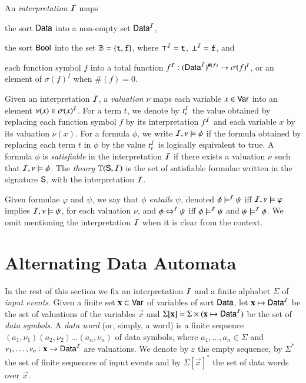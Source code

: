 \documentclass{llncs}
\begin{document}
An \emph{interpretation} $\mathcal{I}$ maps\begin{inparaenum}[(1)]
\item the sort $\mathsf{Data}$ into a non-empty set $\mathsf{Data}^{\mathcal{I}}$, 
%
\item the sort $\mathsf{Bool}$ into the set $\mathbb{B} = \left\{ \mathtt{t},\mathtt{f} \right\}$, where
  $\top^{\mathcal{I}} = \mathtt{t}$, $\bot^{\mathcal{I}} = \mathtt{f}$, and
%
\item each function symbol $f$ into a total function $f^{\mathcal{I}} :
  (\mathsf{Data}^{\mathcal{I}})^{\#(f)} \rightarrow \sigma(f)^I$, or an element of
  $\sigma(f)^I$ when $\#(f)=0$.
\end{inparaenum}
Given an interpretation $\mathcal{I}$, a \emph{valuation} $\nu$ maps each
variable $x \in \mathsf{Var}$ into an element $\nu(x) \in \sigma(x)^{\mathcal{I}}$. For
a term $t$, we denote by $t^{\mathcal{I}}_\nu$ the value obtained by replacing
each function symbol $f$ by its interpretation $f^{\mathcal{I}}$ and each
variable $x$ by its valuation $\nu(x)$. For a formula $\phi$, we write
$\mathcal{I},\nu \models \phi$ if the formula obtained by replacing each term
$t$ in $\phi$ by the value $t^{\mathcal{I}}_\nu$ is logically equivalent to true.
A formula $\phi$ is \emph{satisfiable} in the interpretation $\mathcal{I}$ if
there exists a valuation $\nu$ such that $\mathcal{I},\nu \models \phi$. The
\emph{theory} $\mathbb{T}(\mathsf{S},\mathcal{I})$ is the set of satisfiable formulae
written in the signature $\mathsf{S}$, with the interpretation $\mathcal{I}$. 

Given formulae $\varphi$ and $\psi$, we say that \emph{$\phi$ entails
  $\psi$}, denoted $\phi \models^{\mathcal{I}} \psi$ iff $\mathcal{I},\nu \models \varphi$
implies $\mathcal{I},\nu \models \psi$, for each valuation $\nu$, and $\phi
\Leftrightarrow^{\mathcal{I}} \psi$ iff $\phi \models^{\mathcal{I}} \psi$ and $\psi \models^{\mathcal{I}} \phi$.
We omit mentioning the interpretation $\mathcal{I}$ when it is clear from the
context.

\section{Alternating Data Automata}

In the rest of this section we fix an interpretation $\mathcal{I}$ and a finite
alphabet $\Sigma$ of \emph{input events}. Given a finite set $\mathbf x
\subset \mathsf{Var}$ of variables of sort $\mathsf{Data}$, let $\mathbf x \mapsto
\mathsf{Data}^{\mathcal{I}}$ be the set of valuations of the variables $\vec{x}$ and
$\Sigma[\mathbf x] = \Sigma \times (\mathbf x \mapsto \mathsf{Data}^{\mathcal{I}})$ be the
set of \emph{data symbols}. A \emph{data word} (or, simply, a word) is
a finite sequence $(a_1,\nu_1)(a_2,\nu_2) \ldots (a_n,\nu_n)$ of data
symbols, where $a_1,\ldots,a_n \in \Sigma$ and $\nu_1,\ldots,\nu_n :
\mathbf x \rightarrow \mathsf{Data}^{\mathcal{I}}$ are valuations. We denote by
$\varepsilon$ the empty sequence, by $\Sigma^*$ the set of finite
sequences of input events and by $\Sigma[\vec{x}]^*$ the set of data
words over $\vec{x}$.
\end{document}
